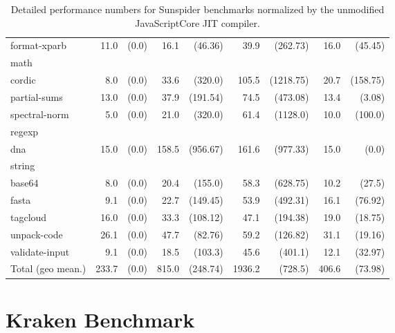 \begin{table}[h!]
{\begin{tabular}{l|rr|rr|rr|rr}
\quad format-xparb & 11.0 & (0.0) & 16.1 & (46.36) & 39.9 & (262.73) & 16.0 & (45.45) \\
math&&&&&&&& \\
\quad cordic & 8.0 & (0.0) & 33.6 & (320.0) & 105.5 & (1218.75) & 20.7 & (158.75) \\
\quad partial-sums & 13.0 & (0.0) & 37.9 & (191.54) & 74.5 & (473.08) & 13.4 & (3.08) \\
\quad spectral-norm & 5.0 & (0.0) & 21.0 & (320.0) & 61.4 & (1128.0) & 10.0 & (100.0) \\
regexp&&&&&&&& \\
\quad dna & 15.0 & (0.0) & 158.5 & (956.67) & 161.6 & (977.33) & 15.0 & (0.0) \\
string&&&&&&&& \\
\quad base64 & 8.0 & (0.0) & 20.4 & (155.0) & 58.3 & (628.75) & 10.2 & (27.5) \\
\quad fasta & 9.1 & (0.0) & 22.7 & (149.45) & 53.9 & (492.31) & 16.1 & (76.92) \\
\quad tagcloud & 16.0 & (0.0) & 33.3 & (108.12) & 47.1 & (194.38) & 19.0 & (18.75) \\
\quad unpack-code & 26.1 & (0.0) & 47.7 & (82.76) & 59.2 & (126.82) & 31.1 & (19.16) \\
\quad validate-input & 9.1 & (0.0) & 18.5 & (103.3) & 45.6 & (401.1) & 12.1 & (32.97) \\
\hline
Total (geo mean.) & 233.7 & (0.0) & 815.0 & (248.74) & 1936.2 & (728.5) & 406.6 & (73.98) \\
\bottomrule
\end{tabular}
}
\caption{Detailed performance numbers for Sunspider benchmarks normalized by the unmodified JavaScriptCore JIT compiler.}
\label{tab:jitflow-performance-sunspider}
\end{table}

\newpage
\section{Kraken Benchmark}

